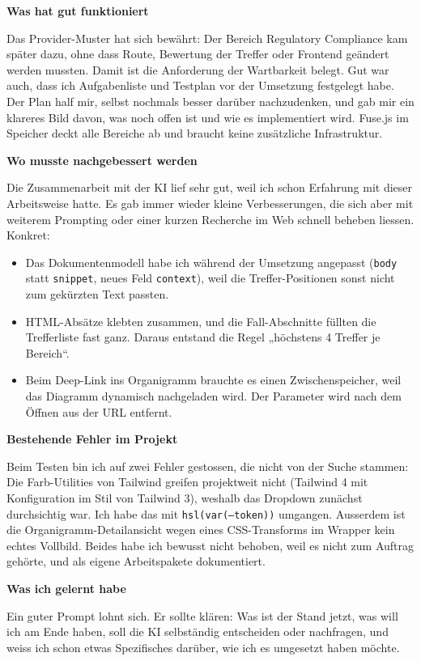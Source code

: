 \documentclass[11pt,a4paper]{article}
\newcommand{\minihead}[1]{\par\needspace{5\baselineskip}\noindent\textbf{#1}\par\nobreak}
\begin{document}
\minihead{Was hat gut funktioniert}
Das Provider-Muster hat sich bewährt: Der Bereich Regulatory Compliance kam später dazu, ohne dass Route, Bewertung der Treffer oder Frontend geändert werden mussten. Damit ist die Anforderung der Wartbarkeit belegt. Gut war auch, dass ich Aufgabenliste und Testplan vor der Umsetzung festgelegt habe. Der Plan half mir, selbst nochmals besser darüber nachzudenken, und gab mir ein klareres Bild davon, was noch offen ist und wie es implementiert wird. Fuse.js im Speicher deckt alle Bereiche ab und braucht keine zusätzliche Infrastruktur.

\minihead{Wo musste nachgebessert werden}
Die Zusammenarbeit mit der KI lief sehr gut, weil ich schon Erfahrung mit dieser Arbeitsweise hatte. Es gab immer wieder kleine Verbesserungen, die sich aber mit weiterem Prompting oder einer kurzen Recherche im Web schnell beheben liessen. Konkret:
\begin{itemize}[nosep]
  \item Das Dokumentenmodell habe ich während der Umsetzung angepasst (\texttt{body} statt \texttt{snippet}, neues Feld \texttt{context}), weil die Treffer-Positionen sonst nicht zum gekürzten Text passten.
  \item HTML-Absätze klebten zusammen, und die Fall-Abschnitte füllten die Trefferliste fast ganz. Daraus entstand die Regel „höchstens 4 Treffer je Bereich“.
  \item Beim Deep-Link ins Organigramm brauchte es einen Zwischenspeicher, weil das Diagramm dynamisch nachgeladen wird. Der Parameter wird nach dem Öffnen aus der URL entfernt.
\end{itemize}

\minihead{Bestehende Fehler im Projekt}
Beim Testen bin ich auf zwei Fehler gestossen, die nicht von der Suche stammen: Die Farb-Utilities von Tailwind greifen projektweit nicht (Tailwind 4 mit Konfiguration im Stil von Tailwind 3), weshalb das Dropdown zunächst durchsichtig war. Ich habe das mit \texttt{hsl(var(--token))} umgangen. Ausserdem ist die Organigramm-Detailansicht wegen eines CSS-Transforms im Wrapper kein echtes Vollbild. Beides habe ich bewusst nicht behoben, weil es nicht zum Auftrag gehörte, und als eigene Arbeitspakete dokumentiert.

\minihead{Was ich gelernt habe}
Ein guter Prompt lohnt sich. Er sollte klären: Was ist der Stand jetzt, was will ich am Ende haben, soll die KI selbständig entscheiden oder nachfragen, und weiss ich schon etwas Spezifisches darüber, wie ich es umgesetzt haben möchte.
\end{document}
